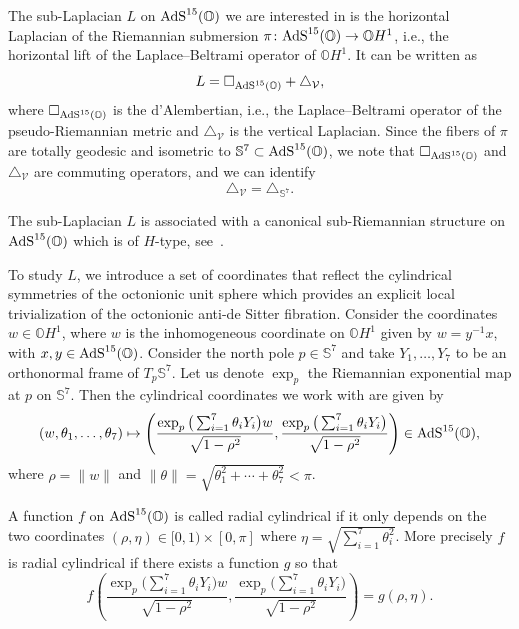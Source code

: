 \documentclass[pdftex]{sigma}
\numberwithin{equation}{section}
\begin{document}
The sub-Laplacian $L$ on ${\rm AdS}^{15}(\mathbb{O})$ we are interested in is the horizontal Laplacian of the Riemannian submersion $\pi\colon {\rm AdS}^{15}(\mathbb{O}) \to \mathbb{O}H^1$, i.e., the horizontal lift of the Laplace--Beltrami operator of $\mathbb{O}H^1$. It can be written as
\begin{equation}\label{eq:sub_Laplacian}
L=\square_{{\rm AdS}^{15}(\mathbb{O})}+\triangle_\mathcal{V},
\end{equation}
where $\square_{{\rm AdS}^{15}(\mathbb{O})}$ is the d'Alembertian, i.e., the Laplace--Beltrami operator of the pseudo-Rie\-man\-nian metric and $\triangle_\mathcal{V}$ is the vertical Laplacian. Since the fibers of $\pi$ are totally geodesic and isometric to $\mathbb{S}^7\subset {\rm AdS}^{15}(\mathbb{O})$, we note that $\square_{{\rm AdS}^{15}(\mathbb{O})}$ and $\triangle_\mathcal{V}$ are commuting operators, and we can identify
\begin{equation}\label{eq:vertical_Laplacian}
\triangle_\mathcal{V}={\triangle}_{\mathbb{S}^{7}}.
\end{equation}

The sub-Laplacian $L$ is associated with a canonical sub-Riemannian structure on ${\rm AdS}^{15}(\mathbb{O})$ which is of $H$-type, see~\cite{BGMR}.

To study $L$, we introduce a set of coordinates that reflect the cylindrical symmetries of the octonionic unit sphere which provides an explicit local trivialization of the octonionic anti-de Sitter fibration. Consider the coordinates $w\in \mathbb{O}H^1$, where $w$ is the inhomogeneous coordinate on $\mathbb{O}H^1$ given by $w=y^{-1} x$, with $x,y\in {\rm AdS}^{15}(\mathbb{O})$. Consider the north pole $p \in \mathbb{S}^7$ and take $Y_1, \dots , Y_7$ to be an orthonormal frame of $T_p \mathbb{S}^7$. Let us denote $\exp_p$ the Riemannian exponential map at $p$ on $\mathbb{S}^7$. Then the cylindrical coordinates we work with are given by
\begin{equation*}
(w,\theta_1, \dots , \theta_7) \mapsto \left(\frac{ \exp_p\big(\sum_{i=1}^{7}\theta_i Y_i\big) w}{\sqrt{1-{\rho}^2}},\frac{ \exp_p\big(\sum_{i=1}^{7}\theta_i Y_i\big)}{\sqrt{1-{\rho}^2}}\right)\in {\rm AdS}^{15}(\mathbb{O}),
\end{equation*}
where $\rho={\|w\|}$ and $\| \theta \|=\sqrt{\theta_1^2+\cdots + \theta_7^2} <\pi$.

A function $f$ on ${\rm AdS}^{15}(\mathbb{O})$ is called radial cylindrical if it only depends on the two coordinates $(\rho,\eta)\in [0,1)\times [0,\pi]$ where $\eta=\sqrt{\sum_{i=1}^{7}\theta^2_i}$. More precisely $f$ is radial cylindrical if there exists a function $g$ so that
\begin{equation*}
f \left(\frac{ \exp_p\big(\sum_{i=1}^{7}\theta_i Y_i\big) w}{\sqrt{1-{\rho}^2}},\frac{ \exp_p\big(\sum_{i=1}^{7}\theta_i Y_i\big)}{\sqrt{1-{\rho}^2}}\right)=g ( \rho, \eta ).
\end{equation*}
\end{document}
